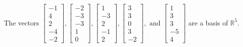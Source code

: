 \begin{exercise}
\begin{exerciseStatement}
  \end{exerciseStatement}
  \begin{exerciseAnswer}
   The vectors \(\left[\begin{array}{r}
-1 \\
4 \\
2 \\
-4 \\
-2
\end{array}\right] , \left[\begin{array}{r}
-2 \\
-3 \\
-3 \\
1 \\
0
\end{array}\right] , \left[\begin{array}{r}
1 \\
-3 \\
2 \\
-1 \\
2
\end{array}\right] , \left[\begin{array}{r}
3 \\
3 \\
0 \\
3 \\
-2
\end{array}\right] , \text{ and } \left[\begin{array}{r}
1 \\
3 \\
3 \\
-5 \\
4
\end{array}\right]\) 
  	 are  a basis of \(\mathbb{R}^5\).
  


  \end{exerciseAnswer}
\end{exercise}